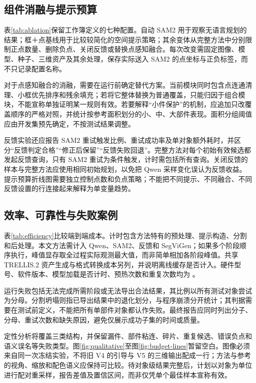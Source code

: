 \subsection{组件消融与提示预算}
表\ref{tab:ablation}保留工作簿定义的七种配置。自动 SAM2 用于观察无语言规划的结果；框＋点基线用于比较较简化的空间提示策略；其余变体从完整方法中分别限制正点数量、删除负点、关闭反馈或替换点感知融合。每次改变需固定图像、模型、种子、三维资产及其余处理，保存实际送入 SAM2 的点坐标与正负标签，而不只记录配置名称。

对于点感知融合的消融，需要在运行前确定替代方案。当前模块同时包含点连通清理、小框优先排序和残余填充；若将它整体替换为普通覆盖，只能归因于组合模块，不能宣称单独证明某一规则有效。若要解释“小件保护”的机制，应追加只改覆盖顺序的严格对照，并统计按参考面积划分的小、中、大部件表现。面积分组阈值应由开发集预先确定，不按测试结果调整。

反馈实验还应报告 SAM2 重试触发比例、重试成功率及单对象额外耗时，并区分“反馈判定合格”“修正后保留”“反馈失败回退”。完整方法对每个初始有效候选都发起反馈查询，只有 SAM2 重试为条件触发，计时需包括所有查询。关闭反馈的样本与完整方法应使用相同初始规划，以免把 Qwen 采样变化误认为反馈收益。提示预算折线图需要独立控制点数和负点策略；不能把不同提示、不同融合、不同反馈设置的行连接起来解释为单变量趋势。



\subsection{效率、可靠性与失败案例}
表\ref{tab:efficiency}比较端到端成本。计时包含方法特有的预处理、提示构造、分割和后处理。本文方法需计入 Qwen、SAM2、反馈和 SegViGen；如果多个阶段顺序执行，峰值显存取全过程实际观测最大值，而非简单相加各阶段峰值。共享 TRELLIS.2 资产生成与格式转换成本另列，并说明离线缓存是否计入。硬件型号、软件版本、模型加载是否计时、预热次数和重复次数均为 。

运行失败包括无法完成所需阶段或无法导出合法结果，其比例以所有测试对象尝试为分母。分割坍塌则指已导出结果中的退化划分，与程序崩溃分开统计；其判据需要在测试前定义，不能把所有单部件对象都认作失败。最终报告应同时列出分子、分母、重试次数和缺失原因，避免仅展示成功子集的时间或质量。

定性分析将覆盖三类结构，并保留漏件、部件粘连、碎片、重复候选、错误负点和语义误名等失败类型。图\ref{fig:qualitative}至图\ref{fig:budget-lines}暂留空白。图像必须来自同一次冻结实验，不将旧 V4 的引导与 V5 的三维输出配成一行；方法与参考的视角、缩放和配色语义应保持可比较。待对象级结果完整后，计划以对象为单位进行配对重采样，报告差值及置信区间，而非仅凭单个最佳样本宣称有效。



